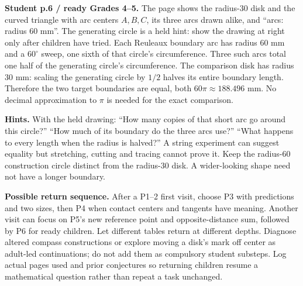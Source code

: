 \documentclass[11pt,letterpaper]{article}
\newcommand{\heading}[1]{\par\vspace{2pt}{\large\bfseries #1}\par}
\newcommand{\lead}[1]{\textbf{#1}}
\begin{document}
\newpage
\heading{Boundary length: Problem 6, and return visits}
\noindent\begin{minipage}[t]{.66\linewidth}\setlength{\parskip}{6pt}
\lead{Student p.6 / ready Grades 4--5.} The page shows the radius-30 disk and the curved triangle with arc centers $A,B,C$, its three arcs drawn alike, and ``arcs: radius 60 mm''. The generating circle is a held hint: show the drawing at right only after children have tried. Each Reuleaux boundary arc has radius 60 mm and a $60^\circ$ sweep, one sixth of that circle's circumference. Three such arcs total one half of the generating circle's circumference. The comparison disk has radius 30 mm: scaling the generating circle by $1/2$ halves its entire boundary length. Therefore the two target boundaries are equal, both $60\pi\approx188.496$ mm. No decimal approximation to $\pi$ is needed for the exact comparison.
\end{minipage}\hfill\begin{minipage}[t]{.3\linewidth}\vspace{0pt}\centering
{}
\end{minipage}

\lead{Hints.} With the held drawing: ``How many copies of that short arc go around this circle?'' ``How much of its boundary do the three arcs use?'' ``What happens to every length when the radius is halved?'' A string experiment can suggest equality but stretching, cutting and tracing cannot prove it. Keep the radius-60 construction circle distinct from the radius-30 disk. A wider-looking shape need not have a longer boundary.

\lead{Possible return sequence.} After a P1--2 first visit, choose P3 with predictions and two sizes, then P4 when contact centers and tangents have meaning. Another visit can focus on P5's new reference point and opposite-distance sum, followed by P6 for ready children. Let different tables return at different depths. Diagnose altered compass constructions or explore moving a disk's mark off center as adult-led continuations; do not add them as compulsory student substeps. Log actual pages used and prior conjectures so returning children resume a mathematical question rather than repeat a task unchanged.
\end{document}
